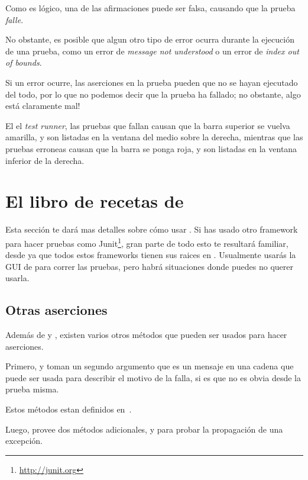 \documentclass[a4paper,10pt,twoside]{book}
\begin{document}
Como es l\'ogico, una de las afirmaciones puede ser falsa, causando que la prueba \emph{falle}. 

No obstante, es posible que algun otro tipo de error ocurra durante la ejecuci\'on de una prueba,
como un error de \emph{message not understood} o un error de \emph{index out of bounds}.

Si un error ocurre, las aserciones en la prueba pueden que no se hayan ejecutado del todo, 
por lo que no podemos decir que la prueba ha fallado; no obstante, algo est\'a claramente mal!

El el \emph{test runner}, las pruebas que fallan causan que la barra superior se vuelva amarilla, 
y son listadas en la ventana del medio sobre la derecha, mientras que
las pruebas erroneas causan que la barra se ponga roja, y son listadas en la ventana inferior de la derecha.


\section{El libro de recetas de \SUnit }

Esta secci\'on te dar\'a mas detalles sobre c\'omo usar \SUnit.  Si has usado
otro framework para hacer pruebas como Junit\footnote{\url{http://junit.org}},
gran parte de todo esto te resultar\'a familiar, desde ya que todos estos frameworks tienen
sus raices en \SUnit.
Usualmente usar\'as la GUI de \SUnit para correr las pruebas, pero 
habr\'a situaciones donde puedes no querer usarla.


\subsection{Otras aserciones}
Adem\'as de  y , existen varios otros m\'etodos que pueden
ser usados para hacer aserciones.

Primero,  y  toman un segundo
argumento que es un mensaje en una cadena que puede ser usada para describir el motivo de la falla,
si es que no es obvia desde la prueba misma.

Estos m\'etodos estan definidos en~.

Luego, \sunit provee dos m\'etodos adicionales,  y 
para probar la propagaci\'on de una excepci\'on. 
\end{document}
